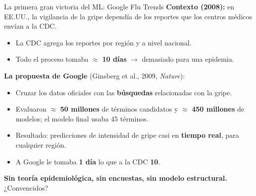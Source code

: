 \documentclass{beamer}
\newcommand{\1}{\mathbb{I}}
\begin{document}
\begin{frame}{La primera gran victoria del ML: Google Flu Trends}
\small
\textbf{Contexto (2008):} en EE.UU., la vigilancia de la gripe dependía de los reportes que los centros médicos envían a la CDC.
\begin{itemize}\itemsep4pt
  \item La CDC agrega los reportes por región y a nivel nacional.
  \item Todo el proceso tomaba $\approx$ \textbf{10 días} $\rightarrow$ demasiado para una epidemia. \pause
\end{itemize}

\vspace{0.2cm}
\textbf{La propuesta de Google} (Ginsberg et al., 2009, \emph{Nature}):
\begin{itemize}\itemsep4pt
  \item Cruzar los datos oficiales con las \textbf{búsquedas} relacionadas con la gripe.
  \item Evaluaron $\approx$ \textbf{50 millones} de términos candidatos y $\approx$ \textbf{450 millones} de modelos; el modelo final usaba 45 términos. \pause
  \item Resultado: predicciones de intensidad de gripe casi en \textbf{tiempo real}, para cualquier región.
  \item A Google le tomaba \textbf{1 día} lo que a la CDC \textbf{10}.
\end{itemize} \pause

\vspace{0.2cm}
\textbf{Sin teoría epidemiológica, sin encuestas, sin modelo estructural.} ¿Convencidos?
\end{frame}
\end{document}

